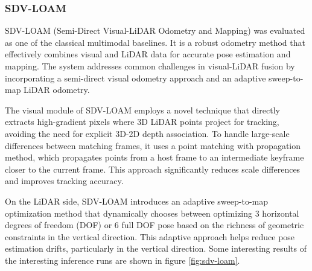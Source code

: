 \documentclass[11pt,a4paper]{article}
\begin{document}
\subsubsection{SDV-LOAM}
SDV-LOAM (Semi-Direct Visual-LiDAR Odometry and Mapping) \cite{sdv-loam} was evaluated as one of the classical multimodal baselines. It is a robust odometry method that effectively combines visual and LiDAR data for accurate pose estimation and mapping. The system addresses common challenges in visual-LiDAR fusion by incorporating a semi-direct visual odometry approach and an adaptive sweep-to-map LiDAR odometry.

The visual module of SDV-LOAM employs a novel technique that directly extracts high-gradient pixels where 3D LiDAR points project for tracking, avoiding the need for explicit 3D-2D depth association. To handle large-scale differences between matching frames, it uses a point matching with propagation method, which propagates points from a host frame to an intermediate keyframe closer to the current frame. This approach significantly reduces scale differences and improves tracking accuracy.

On the LiDAR side, SDV-LOAM introduces an adaptive sweep-to-map optimization method that dynamically chooses between optimizing 3 horizontal degrees of freedom (DOF) or 6 full DOF pose based on the richness of geometric constraints in the vertical direction. This adaptive approach helps reduce pose estimation drifts, particularly in the vertical direction. Some interesting results of the interesting inference runs are shown in figure \ref{fig:sdv-loam}.
\end{document}
